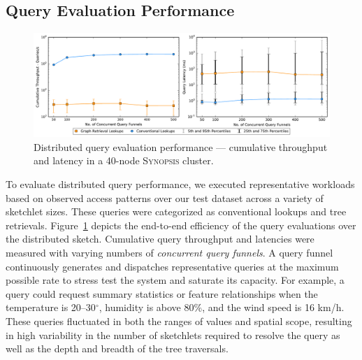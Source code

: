 \documentclass[9pt,journal,compsoc]{IEEEtran}
\begin{document}
\subsection{Query Evaluation Performance}
\begin{figure}
    \centerline{\includegraphics[width=\linewidth]{figures/query_benchmark_both.pdf}}
    \caption{Distributed query evaluation performance --- cumulative throughput and latency in a 40-node \textsc{Synopsis} cluster.}
    \label{fig:dist-query}
\end{figure}
To evaluate distributed query performance, we executed representative workloads based on observed access patterns over our test dataset across a variety of sketchlet sizes. These queries were categorized as conventional lookups and tree retrievals.  Figure~\ref{fig:dist-query} depicts the end-to-end efficiency of the query evaluations over the distributed sketch.
Cumulative query throughput and latencies were measured with varying numbers of \emph{concurrent query funnels}.
A query funnel continuously generates and dispatches representative queries at the maximum possible rate to stress test the system and saturate its capacity. For example, a query could request summary statistics or feature relationships when the temperature is 20--30$^{\circ}$, humidity is above 80\%, and the wind speed is 16 km/h.
These queries fluctuated in both the ranges of values and spatial scope, resulting in high variability in the number of sketchlets required to resolve the query as well as the depth and breadth of the tree traversals.
\end{document}
